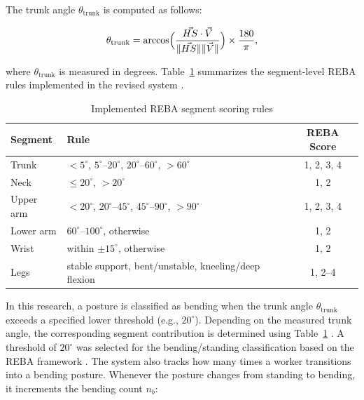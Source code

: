 \documentclass[11pt]{article}
\renewcommand{\baselinestretch}{1.5}
\begin{document}
\noindent The trunk angle \(\theta_{\text{trunk}}\) is computed as follows:

\begin{equation}
    \theta_{\text{trunk}} 
    = \arccos \Bigl( \frac{\vec{HS} \cdot \vec{V}}{\|\vec{HS}\|\|\vec{V}\|} \Bigr)
    \times \frac{180}{\pi},
\end{equation}

\noindent where \(\theta_{\text{trunk}}\) is measured in degrees.     Table~\ref{table:reba_segments} summarizes the segment-level REBA rules implemented in the revised system .
 

\begin{table}[H]
\renewcommand{\baselinestretch}{1.0}\selectfont %
\renewcommand{\arraystretch}{0.92}              %
\setlength{\tabcolsep}{4pt}                     %
\centering
\small
\caption{Implemented REBA segment scoring rules}
\begin{tabular}{l|p{4.9cm}|c}
\hline
\textbf{Segment} & \textbf{Rule} & \textbf{REBA Score} \\
\hline
Trunk & $<5^\circ$, $5^\circ$--$20^\circ$, $20^\circ$--$60^\circ$, $>60^\circ$ & 1, 2, 3, 4 \\
Neck & $\leq 20^\circ$, $>20^\circ$ & 1, 2 \\
Upper arm & $<20^\circ$, $20^\circ$--$45^\circ$, $45^\circ$--$90^\circ$, $>90^\circ$ & 1, 2, 3, 4 \\
Lower arm & $60^\circ$--$100^\circ$, otherwise & 1, 2 \\
Wrist & within $\pm 15^\circ$, otherwise & 1, 2 \\
Legs & stable support, bent/unstable, kneeling/deep flexion & 1, 2--4 \\
\hline
\end{tabular}
    \label{table:reba_segments}
  \end{table}

In this research, a posture is classified as bending when the trunk angle \(\theta_{\text{trunk}}\) exceeds a specified lower threshold (e.g., $20^\circ$).
Depending on the measured trunk angle,     the corresponding segment contribution is determined using Table~\ref{table:reba_segments}  . A threshold of $20^\circ$ was selected   for the bending/standing classification   based on the REBA framework \citep{hignett2000rapid}. The system also tracks how many times a worker transitions into a bending posture. Whenever the posture changes from standing to bending, it increments the bending count \(n_b\):
\end{document}
